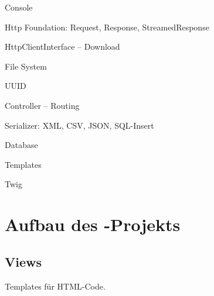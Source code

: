 Console \cite[Console Commands]{symfony-command}

Http Foundation: Request, Response, StreamedResponse \cite[The HttpFoundation Component]{symfony-http}

HttpClientInterface -- Download \cite[HTTP Client]{symfony-client}

File System \cite[The Filesystem Component]{symfony-file}

UUID \cite[The UID Component]{symfony-uuid}

Controller -- Routing  \cite[Controller]{symfony-controller}

Serializer: XML, CSV, JSON, SQL-Insert \cite[The Serializer Component]{symfony-serializer}

Database \cite[Databases and the Doctrine ORM]{symfony-db}

Templates \cite[Creating and Using Templates]{symfony-templates}

Twig \cite{twig}

\begin{figure}[H]
    \centering
    \setlength{\fboxsep}{10pt}\color{black!20}
    \normalcolor
\end{figure}

\section{Aufbau des \bfarmer-Projekts}

\subsection{Views}

Templates für HTML-Code. 


